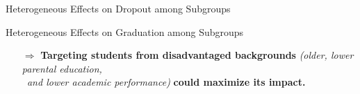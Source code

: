 \documentclass[aspectratio=169]{beamer}
\begin{document}
\begin{frame}{Heterogeneous Effects on Dropout among Subgroups}
\vspace{5pt}

\begin{exampleblock}{Heterogeneous Effects on Graduation among Subgroups}
\vspace{-4pt}
\begin{itemize}
    \item [$\Rightarrow$]
 \textbf{Targeting students from disadvantaged backgrounds} \textit{(older, lower parental education, \\ and lower academic performance)} \textbf{could maximize its impact.}
\end{itemize}
\vspace{-4pt}
	
\end{exampleblock}


\end{frame}
\end{document}
